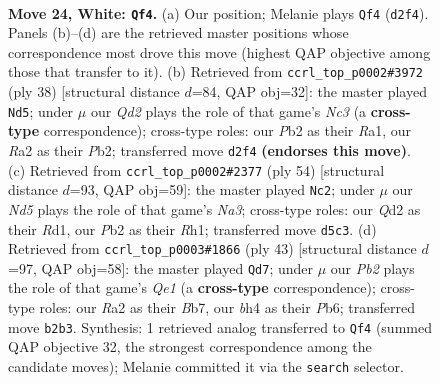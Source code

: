 \documentclass[11pt]{article}
\begin{document}
\clearpage

\begin{figure}[p]\centering
\begin{subfigure}{0.46\textwidth}\centering
\resizebox{\linewidth}{!}{%
\newchessgame
\chessboard[
  setfen={rn1qk2r/8/1p1p1p2/pPpN4/4P2b/5N1P/RP1Q2P1/2K4R w q - 0 24},
  showmover=false,
  pgfstyle=straightmove, color=movearrow, markmove={d2-f4}
]}
\caption{}
\end{subfigure}\hfill
\begin{subfigure}{0.46\textwidth}\centering
\resizebox{\linewidth}{!}{%
\newchessgame
\chessboard[
  setfen={1n2qr1k/r5pp/p3Bb2/1p6/2pPQ3/2N1P3/1P3P1P/R3K2R w KQ - 1 20},
  showmover=false,
  pgfstyle=straightmove, color=movearrow, markmove={c3-d5}
]}
\caption{}
\end{subfigure}
\\[4pt]
\begin{subfigure}{0.46\textwidth}\centering
\resizebox{\linewidth}{!}{%
\newchessgame
\chessboard[
  setfen={2k1b2r/p1q5/5r2/1p2N1pp/2pPPn2/N1P2P2/1P5Q/1K1R3R w - - 0 28},
  showmover=false,
  pgfstyle=straightmove, color=movearrow, markmove={a3-c2}
]}
\caption{}
\end{subfigure}\hfill
\begin{subfigure}{0.46\textwidth}\centering
\resizebox{\linewidth}{!}{%
\newchessgame
\chessboard[
  setfen={3rq1k1/pb3pp1/1p3n1p/2pP4/P1N5/1PR3P1/5PBP/3Q2K1 b - - 0 22},
  showmover=false,
  pgfstyle=straightmove, color=movearrow, markmove={e8-d7}
]}
\caption{}
\end{subfigure}
\caption{\textbf{Move 24, White: \texttt{Qf4}.} (a) Our position; Melanie plays \texttt{Qf4} (\texttt{d2f4}). Panels (b)--(d) are the retrieved master positions whose correspondence most drove this move (highest QAP objective among those that transfer to it). (b) Retrieved from \texttt{ccrl\_top\_p0002\#3972} (ply 38) [structural distance $d$=84, QAP obj=32]: the master played \texttt{Nd5}; under $\mu$ our \emph{Qd2} plays the role of that game's \emph{Nc3} (a \textbf{cross-type} correspondence); cross-type roles: our \emph{P}b2 as their \emph{R}a1, our \emph{R}a2 as their \emph{P}b2; transferred move \texttt{d2f4} \textbf{(endorses this move)}. (c) Retrieved from \texttt{ccrl\_top\_p0002\#2377} (ply 54) [structural distance $d$=93, QAP obj=59]: the master played \texttt{Nc2}; under $\mu$ our \emph{Nd5} plays the role of that game's \emph{Na3}; cross-type roles: our \emph{Q}d2 as their \emph{R}d1, our \emph{P}b2 as their \emph{R}h1; transferred move \texttt{d5c3}. (d) Retrieved from \texttt{ccrl\_top\_p0003\#1866} (ply 43) [structural distance $d$=97, QAP obj=58]: the master played \texttt{Qd7}; under $\mu$ our \emph{Pb2} plays the role of that game's \emph{Qe1} (a \textbf{cross-type} correspondence); cross-type roles: our \emph{R}a2 as their \emph{B}b7, our \emph{b}h4 as their \emph{P}b6; transferred move \texttt{b2b3}. Synthesis: 1 retrieved analog transferred to \texttt{Qf4} (summed QAP objective 32, the strongest correspondence among the candidate moves); Melanie committed it via the \texttt{search} selector.}
\label{fig:thought-m46}
\end{figure}
\end{document}
